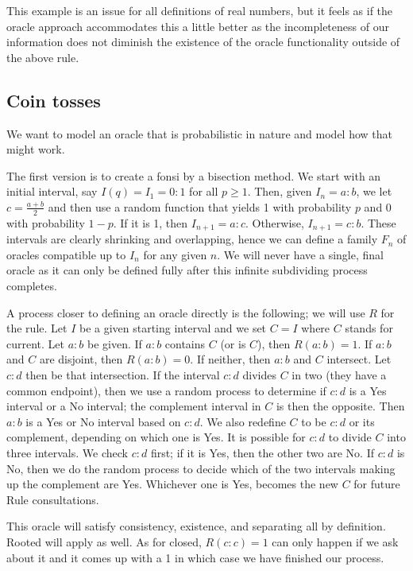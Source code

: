 \documentclass[12pt]{article}
\theoremstyle{remark}
\begin{document}
This example is an issue for all definitions of real numbers, but it feels as if the oracle approach accommodates this a little better as the incompleteness of our information does not diminish the existence of the oracle functionality outside of the above rule. 

\subsection{Coin tosses}

We want to model an oracle that is probabilistic in nature and model how that might work. 

The first version is to create a fonsi by a bisection method. We start with an initial interval, say $I(q) = I_1 = 0:1$ for all $p\geq 1$. Then, given $I_n = a:b$, we let $c = \tfrac{a+b}{2}$ and then use a random function that yields 1 with probability $p$ and 0 with probability $1-p$. If it is 1, then $I_{n+1} = a:c$. Otherwise, $I_{n+1} = c:b$. These intervals are clearly shrinking and overlapping, hence we can define a family $F_n$ of oracles compatible up to $I_n$ for any given $n$. We will never have a single, final oracle as it can only be defined fully after this infinite subdividing process completes. 

A process closer to defining an oracle directly is the following; we will use $R$ for the rule. Let $I$ be a given starting interval and we set $C=I$ where $C$ stands for current. Let $a:b$ be given. If $a:b$ contains $C$ (or is $C$), then $R(a:b) = 1$. If $a:b$ and $C$ are disjoint, then $R(a:b) = 0$. If neither, then $a:b$ and $C$ intersect. Let $c:d$ then be that intersection. If the interval $c:d$ divides $C$ in two (they have a common endpoint), then we use a random process to determine if $c:d$ is a Yes interval or a No interval; the complement interval in $C$ is then the opposite. Then $a:b$ is a Yes or No interval based on $c:d$. We also redefine $C$ to be $c:d$ or its complement, depending on which one is Yes. It is possible for $c:d$ to divide $C$ into three intervals. We check $c:d$ first; if it is Yes, then the other two are No. If $c:d$ is No, then we do the random process to decide which of the two intervals making up the complement are Yes. Whichever one is Yes, becomes the new $C$ for future Rule consultations.  

This oracle will satisfy consistency, existence, and separating all by definition. Rooted will apply as well. As for closed, $R(c:c)=1$ can only happen if we ask about it and it comes up with a 1 in which case we have finished our process. 
\end{document}
